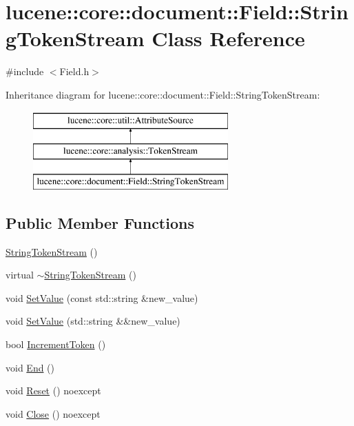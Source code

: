 \hypertarget{classlucene_1_1core_1_1document_1_1Field_1_1StringTokenStream}{}\section{lucene\+:\+:core\+:\+:document\+:\+:Field\+:\+:String\+Token\+Stream Class Reference}
\label{classlucene_1_1core_1_1document_1_1Field_1_1StringTokenStream}


{\ttfamily \#include $<$Field.\+h$>$}

Inheritance diagram for lucene\+:\+:core\+:\+:document\+:\+:Field\+:\+:String\+Token\+Stream\+:\begin{figure}[H]
\begin{center}
\leavevmode
\includegraphics[height=3.000000cm]{classlucene_1_1core_1_1document_1_1Field_1_1StringTokenStream}
\end{center}
\end{figure}
\subsection*{Public Member Functions}
\begin{DoxyCompactItemize}
\item 
\mbox{\hyperlink{classlucene_1_1core_1_1document_1_1Field_1_1StringTokenStream_afccecc9c42efd7a2f877f1603dc6fe24}{String\+Token\+Stream}} ()
\item 
virtual \mbox{\hyperlink{classlucene_1_1core_1_1document_1_1Field_1_1StringTokenStream_a6331ec9abcbb378340d8d3b529984877}{$\sim$\+String\+Token\+Stream}} ()
\item 
void \mbox{\hyperlink{classlucene_1_1core_1_1document_1_1Field_1_1StringTokenStream_a0727fbba4424072d259632cb89b74d35}{Set\+Value}} (const std\+::string \&new\+\_\+value)
\item 
void \mbox{\hyperlink{classlucene_1_1core_1_1document_1_1Field_1_1StringTokenStream_a34c53a9c739f3ceba09c86b1fd66285f}{Set\+Value}} (std\+::string \&\&new\+\_\+value)
\item 
bool \mbox{\hyperlink{classlucene_1_1core_1_1document_1_1Field_1_1StringTokenStream_a161893ca5de24e392426fea5999334fb}{Increment\+Token}} ()
\item 
void \mbox{\hyperlink{classlucene_1_1core_1_1document_1_1Field_1_1StringTokenStream_acbadfa77de855b030af35f1206231525}{End}} ()
\item 
void \mbox{\hyperlink{classlucene_1_1core_1_1document_1_1Field_1_1StringTokenStream_ac0073673de4b2eb307408d1aee40625c}{Reset}} () noexcept
\item 
void \mbox{\hyperlink{classlucene_1_1core_1_1document_1_1Field_1_1StringTokenStream_acbf15ee849ed8055143c77b96f116cf0}{Close}} () noexcept
\end{DoxyCompactItemize}
